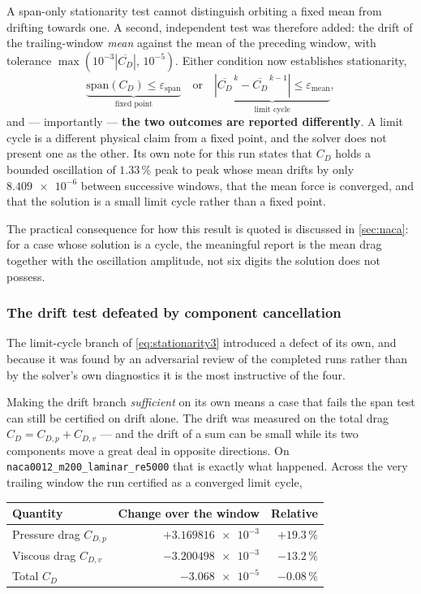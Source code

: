 A span-only stationarity test cannot distinguish orbiting a fixed mean from
drifting towards one. A second, independent test was therefore added: the drift of
the trailing-window \emph{mean} against the mean of the preceding window, with
tolerance $\max\!\left(10^{-3}|\overline{C_D}|,\,10^{-5}\right)$. Either condition
now establishes stationarity,
\begin{equation}
  \underbrace{\mathrm{span}(C_D)\le\varepsilon_{\mathrm{span}}}_{\text{fixed point}}
  \quad\text{or}\quad
  \underbrace{\left|\overline{C_D}^{\,k}-\overline{C_D}^{\,k-1}\right|
  \le\varepsilon_{\mathrm{mean}}}_{\text{limit cycle}},
  \label{eq:stationarity3}
\end{equation}
and --- importantly --- \textbf{the two outcomes are reported differently}. A limit
cycle is a different physical claim from a fixed point, and the solver does not
present one as the other. Its own note for this run states that $C_D$ holds a
bounded oscillation of $1.33\,\%$ peak to peak whose mean drifts by only
$\num{8.409e-6}$ between successive windows, that the mean force is converged, and
that the solution is a small limit cycle rather than a fixed point.

The practical consequence for how this result is quoted is discussed in
\cref{sec:naca}: for a case whose solution is a cycle, the meaningful report is the
mean drag together with the oscillation amplitude, not six digits the solution does
not possess.

\subsubsection{The drift test defeated by component cancellation}
\label{sec:cancellation}

The limit-cycle branch of \cref{eq:stationarity3} introduced a defect of its own,
and because it was found by an adversarial review of the completed runs rather than
by the solver's own diagnostics it is the most instructive of the four.

Making the drift branch \emph{sufficient} on its own means a case that fails the
span test can still be certified on drift alone. The drift was measured on the
total drag $C_D=C_{D,p}+C_{D,v}$ --- and the drift of a sum can be small while its
two components move a great deal in opposite directions. On
\texttt{naca0012\_m200\_laminar\_re5000} that is exactly what happened. Across the
very trailing window the run certified as a converged limit cycle,

\begin{center}
\begin{tabular}{lrr}
  \toprule
  Quantity & Change over the window & Relative \\
  \midrule
  Pressure drag $C_{D,p}$ & $+\num{3.169816e-3}$ & $+19.3\,\%$ \\
  Viscous drag $C_{D,v}$ & $-\num{3.200498e-3}$ & $-13.2\,\%$ \\
  \midrule
  Total $C_D$ & $-\num{3.068e-5}$ & $-0.08\,\%$ \\
  \bottomrule
\end{tabular}
\end{center}

